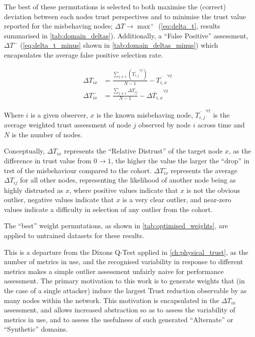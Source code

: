 The best of these permutations is selected to both maximise the (correct) deviation between each nodes trust perspectives and to minimise the trust value reported for the misbehaving nodes; $\Delta T \to \max^+$ (\autoref{eq:delta_t}, results summarised in \autoref{tab:domain_deltas}).
Additionally, a ``False Positive'' assessment, $\Delta T^-$ (\autoref{eq:delta_t_minus} shown in \autoref{tab:domain_deltas_minus}) which encapsulates the average false positive selection rate.

\begin{align}
  \Delta T_{ix} &= \frac{\sum_{j\neq x}\left( \overline{T_{i,j}}^{\forall t}\right)}{N-1} - \overline{T_{i,x}}^{\forall t} \label{eq:delta_t}\\
  \Delta T_{ix}^- &= \frac{\sum_{j\neq x} \Delta T_{ij}}{N-1} - \overline{\Delta T_{i,x}}^{\forall t} \label{eq:delta_t_minus} 
\end{align}

Where $i$ is a given observer, $x$ is the known misbehaving node, $\overline{T_{i,j}}^{\forall t}$ is the average weighted trust assessment of node $j$ observed by node $i$ across time and $N$ is the number of nodes.

Conceptually, $\Delta T_{ix}$ represents the ``Relative Distrust'' of the target node $x$, as the difference in trust value from $0\to1$, the higher the value the larger the ``drop'' in trst of the misbehaviour compared to the cohort. 
$\Delta T_{ix}^-$ represents the average $\Delta T_{ij}$ for all other nodes, representing the likelihood of another node being as highly distrusted as $x$, where positive values indicate that $x$ is not the obvious outlier, negative values indicate that $x$ is a very clear outlier, and near-zero values indicate a difficulty in selection of any outlier from the cohort.

The ``best'' weight permutations, as shown in \autoref{tab:optimised_weights}, are applied to untrained datasets for these results.

This is a departure from the Dixons Q-Test applied in \autoref{ch:physical_trust}, as the number of metrics in use, and the recognised variability in response to different metrics makes a simple outlier assessment unfairly naive for performance assessment. 
The primary motivation to this work is to generate weights that (in the case of a single attacker) induce the largest Trust reduction observable by as many nodes within the network.
This motivation is encapsulated in the $\Delta T_{ix}$ assessment, and allows increased abstraction so as to assess the variability of metrics in use, and to assess the usefulness of such generated ``Alternate'' or ``Synthetic'' domains.

